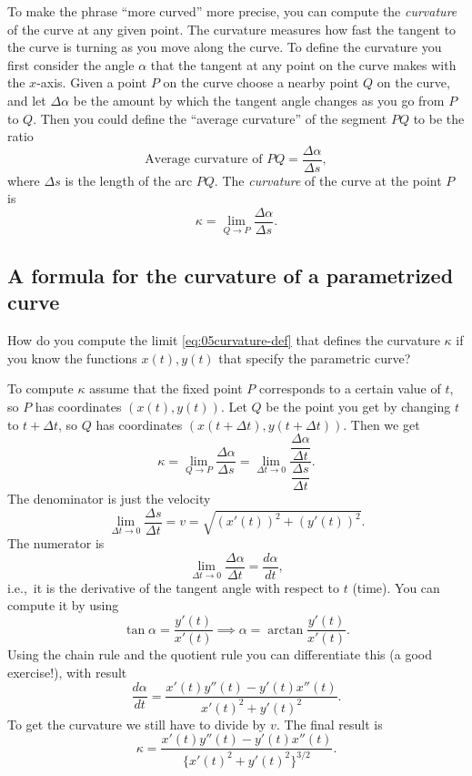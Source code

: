 To make the phrase ``more curved'' more precise, you can compute the
\emph{curvature} of the curve at any given point.  The curvature
measures how fast the tangent to the curve is turning as you move
along the curve.  To define the curvature you first consider the angle
$\alpha$ that the tangent at any point on the curve makes with the
$x$-axis.  Given a point $P$ on the curve choose a nearby point $Q$
on the curve, and let $\Delta\alpha$ be the amount by which the
tangent angle changes as you go from $P$ to $Q$.  Then you could
define the ``average curvature'' of the segment $PQ$ to be the ratio
\[
\text{Average curvature of } PQ
= \frac{\Delta\alpha} {\Delta s},
\]
\marginpar{ }%
where $\Delta s$ is the length of the arc $PQ$.  The \emph{curvature}
of the curve at the point $P$ is
\begin{equation}
  \kappa 
  = \lim_{Q\to P}  \frac{\Delta\alpha} {\Delta s}. 
  \label{eq:05curvature-def}
\end{equation}

\subsection{A formula for the curvature of a parametrized curve}
\label{sec:formula-curvature-parametrized-curve}
How do you compute the limit \eqref{eq:05curvature-def} that defines
the curvature $\kappa$ if you know the functions $x(t), y(t)$ that specify the
parametric curve?

To compute $\kappa$ assume that the fixed point $P$ corresponds to a
certain value of $t$, so $P$ has coordinates $(x(t), y(t))$.  Let $Q$
be the point you get by changing $t$ to $t+\Delta t$, so $Q$ has
coordinates  $(x(t+\Delta t), y(t+\Delta t))$.  Then we get
\[
\kappa
= \lim_{Q\to P}  \frac{\Delta\alpha} {\Delta s}
= \lim_{\Delta t\to 0}
\frac{\dfrac{\Delta\alpha} {\Delta t}} {\dfrac{\Delta s} {\Delta t}}.
\]
The denominator is just the velocity
\[
\lim_{\Delta t\to 0} \dfrac{\Delta s} {\Delta t} = v = \sqrt{(x'(t))^2
+ (y'(t))^2}.
\]
The numerator is
\[
\lim_{\Delta t\to 0}
\frac{\Delta\alpha} {\Delta t} = \frac{d\alpha} {dt},
\]
i.e.,~it is the derivative of the tangent angle with respect to $t$
(time).  You can compute it by using
\[
\tan \alpha = \frac{y'(t)} {x'(t)}
\implies
\alpha = \arctan \frac{y'(t)} {x'(t)}.
\]
Using the chain rule and the quotient rule you can differentiate this
(a good exercise!), with result
\begin{equation}
	\frac{d\alpha} {dt} = \frac{x'(t)y''(t) - y'(t)x''(t)} {x'(t)^2
	+ y'(t)^2}.
	\label{eq:05curvature-computation}
\end{equation}
To get the curvature we still have to divide by $v$.  The final result
is
\begin{equation}
  \kappa = \frac{x'(t)y''(t) - y'(t)x''(t)}
                {\bigl\{x'(t)^2 + y'(t)^2\bigr\}^{3/2}}.
  \label{eq:05curvature-of-parametrized-curve}
\end{equation}

